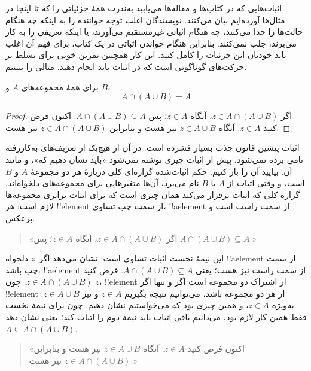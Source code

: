 \documentclass[../../../include/open-logic-section]{subfiles}
\begin{document}

اثبات‌هایی که در کتاب‌ها و مقاله‌ها می‌یابید به‌ندرت همهٔ جزئیاتی را
که تا اینجا در مثال‌ها آورده‌ایم بیان می‌کنند. نویسندگان اغلب توجه
خواننده را به اینکه چه هنگام حالت‌ها را جدا می‌کنند، چه هنگام اثباتی
غیرمستقیم می‌آورند، یا اینکه تعریفی را به کار می‌برند، جلب نمی‌کنند.
بنابراین هنگام خواندن اثباتی در یک کتاب، برای فهم آن اغلب باید خودتان
این جزئیات را کامل کنید. این کار همچنین تمرین خوبی برای تسلط بر
حرکت‌های گوناگونی است که در اثبات باید انجام دهید. مثالی را ببینیم.

\begin{prop}[جذب]
برای همهٔ مجموعه‌های $A$ و $B$،
\[
A \cap (A \cup B) = A
\]
\end{prop}

\begin{proof}
اگر $z \in A \cap (A \cup B)$، آنگاه $z \in A$؛ پس
$A \cap (A \cup B) \subseteq A$. اکنون فرض کنید $z \in A$. آنگاه
$z \in A \cup B$ نیز هست و بنابراین $z \in A \cap (A \cup B)$ نیز هست.
\end{proof}

اثبات پیشین قانون جذب بسیار فشرده است. در آن از هیچ‌یک از تعریف‌های
به‌کاررفته نامی برده نمی‌شود، پیش از اثبات چیزی نوشته نمی‌شود «باید
نشان دهیم که»، و مانند آن. بیایید آن را باز کنیم. حکم اثبات‌شده گزاره‌ای
کلی دربارهٔ هر دو مجموعهٔ $A$ و $B$ است، و وقتی اثبات از $A$ یا $B$
نام می‌برد، آن‌ها متغیرهایی برای مجموعه‌های دلخواه‌اند. گزارهٔ کلی که
اثبات برقرار می‌کند همان چیزی است که برای اثبات برابری مجموعه‌ها لازم
است: هر !!{element} از سمت چپ تساوی، !!a{element} از سمت راست است و
برعکس.

\begin{quote}
«اگر $z \in A \cap (A \cup B)$، آنگاه $z \in A$؛ پس
  $A \cap (A \cup B) \subseteq A$.»
\end{quote}

این نیمهٔ نخست اثبات تساوی است: نشان می‌دهد اگر~$z$ دلخواه
!!a{element} از سمت چپ باشد، !!a{element} از سمت راست نیز هست؛ یعنی
$A \cap (A \cup B) \subseteq A$. فرض کنید
$z \in A \cap (A \cup B)$. چون $z$، !!{element} از اشتراک دو مجموعه
است اگر و تنها اگر !!{element} از هر دو مجموعه باشد، می‌توانیم نتیجه
بگیریم $z \in A$ و نیز $z \in A \cup B$. به‌ویژه $z \in A$، و همین
چیزی بود که می‌خواستیم نشان دهیم. چون برای نیمهٔ نخست فقط همین کار لازم
بود، می‌دانیم باقی اثبات باید نیمهٔ دوم را اثبات کند؛ یعنی نشان دهد
$A \subseteq A \cap (A \cup B)$.

\begin{quote}
«اکنون فرض کنید $z \in A$. آنگاه $z \in A \cup B$ نیز هست و بنابراین
  $z \in A \cap (A \cup B)$ نیز هست.»
\end{quote}
\end{document}
